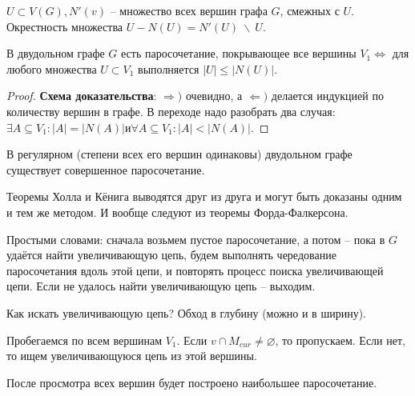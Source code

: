	\begin{Def}
		$U \subset V(G), N'(v)$ -- множество всех вершин графа $G$, смежных с $U$. Окрестность множества $U - N(U) = N'(U) \ \backslash \ U$.
	\end{Def}

	\begin{Thm}[Холл, 1935]
		В двудольном графе $G$ есть паросочетание, покрывающее все вершины $V_1 \Leftrightarrow$ для любого множества $U \subset V_1$ выполняется $|U| \leqslant |N(U)|$.
	\end{Thm}	

	\begin{proof}
		\textbf{Схема доказательства}: $\Rightarrow)$ очевидно, а $\Leftarrow)$ делается индукцией по количеству вершин в графе. В переходе надо разобрать два случая:
		$\exists A \subseteq V_1 : |A| = |N(A)| и \forall A \subseteq V_1: |A| < |N(A)|$.
	\end{proof}

	\begin{Cons}[Кёниг]
		В регулярном (степени всех его вершин одинаковы) двудольном графе существует совершенное паросочетание.
	\end{Cons}

	\begin{Rem}
		Теоремы Холла и Кёнига выводятся друг из друга и могут быть доказаны одним и тем же методом. 
		И вообще следуют из теоремы Форда-Фалкерсона.
	\end{Rem}


	Простыми словами: сначала возьмем пустое паросочетание, а потом -- пока в $G$ удаётся найти увеличивающую цепь, будем выполнять чередование паросочетания вдоль этой цепи, и повторять процесс поиска увеличивающей цепи. 
	Если не удалось найти увеличивающую цепь -- выходим. 
	
	Как искать увеличивающую цепь? Обход в глубину (можно и в ширину).

	Пробегаемся по всем вершинам $V_1$. Если $v \cap M_{cur} \neq \varnothing$, то пропускаем. Если нет, то ищем увеличивающуюся цепь из этой вершины.

	После просмотра всех вершин будет построено наибольшее паросочетание.
	
